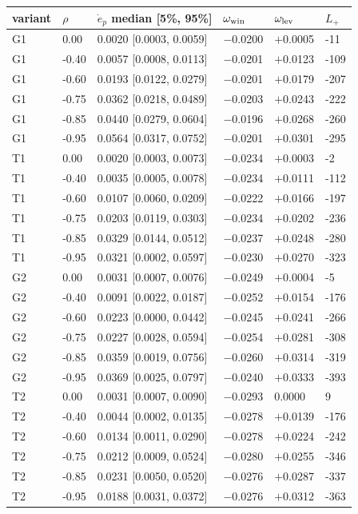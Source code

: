 \begin{tabular}{llllll}\toprule variant & $\rho$ & $\dot e_p$ median [5\%, 95\%] & $\omega_{\rm win}$ & $\omega_{\rm lev}$ & $L_+$\\\midrule
G1 & 0.00 & 0.0020 [0.0003, 0.0059] & $-$0.0200 & $+$0.0005 & -11\\
G1 & -0.40 & 0.0057 [0.0008, 0.0113] & $-$0.0201 & $+$0.0123 & -109\\
G1 & -0.60 & 0.0193 [0.0122, 0.0279] & $-$0.0201 & $+$0.0179 & -207\\
G1 & -0.75 & 0.0362 [0.0218, 0.0489] & $-$0.0203 & $+$0.0243 & -222\\
G1 & -0.85 & 0.0440 [0.0279, 0.0604] & $-$0.0196 & $+$0.0268 & -260\\
G1 & -0.95 & 0.0564 [0.0317, 0.0752] & $-$0.0201 & $+$0.0301 & -295\\
T1 & 0.00 & 0.0020 [0.0003, 0.0073] & $-$0.0234 & $+$0.0003 & -2\\
T1 & -0.40 & 0.0035 [0.0005, 0.0078] & $-$0.0234 & $+$0.0111 & -112\\
T1 & -0.60 & 0.0107 [0.0060, 0.0209] & $-$0.0222 & $+$0.0166 & -197\\
T1 & -0.75 & 0.0203 [0.0119, 0.0303] & $-$0.0234 & $+$0.0202 & -236\\
T1 & -0.85 & 0.0329 [0.0144, 0.0512] & $-$0.0237 & $+$0.0248 & -280\\
T1 & -0.95 & 0.0321 [0.0002, 0.0597] & $-$0.0230 & $+$0.0270 & -323\\
G2 & 0.00 & 0.0031 [0.0007, 0.0076] & $-$0.0249 & $+$0.0004 & -5\\
G2 & -0.40 & 0.0091 [0.0022, 0.0187] & $-$0.0252 & $+$0.0154 & -176\\
G2 & -0.60 & 0.0223 [0.0000, 0.0442] & $-$0.0245 & $+$0.0241 & -266\\
G2 & -0.75 & 0.0227 [0.0028, 0.0594] & $-$0.0254 & $+$0.0281 & -308\\
G2 & -0.85 & 0.0359 [0.0019, 0.0756] & $-$0.0260 & $+$0.0314 & -319\\
G2 & -0.95 & 0.0369 [0.0025, 0.0797] & $-$0.0240 & $+$0.0333 & -393\\
T2 & 0.00 & 0.0031 [0.0007, 0.0090] & $-$0.0293 & 0.0000 & 9\\
T2 & -0.40 & 0.0044 [0.0002, 0.0135] & $-$0.0278 & $+$0.0139 & -176\\
T2 & -0.60 & 0.0134 [0.0011, 0.0290] & $-$0.0278 & $+$0.0224 & -242\\
T2 & -0.75 & 0.0212 [0.0009, 0.0524] & $-$0.0280 & $+$0.0255 & -346\\
T2 & -0.85 & 0.0231 [0.0050, 0.0520] & $-$0.0276 & $+$0.0287 & -337\\
T2 & -0.95 & 0.0188 [0.0031, 0.0372] & $-$0.0276 & $+$0.0312 & -363\\
\bottomrule\end{tabular}
